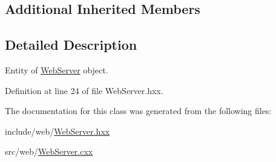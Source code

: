 \subsection*{Additional Inherited Members}


\subsection{Detailed Description}
Entity of \mbox{\hyperlink{classeven_1_1_web_server}{Web\+Server}} object. 

Definition at line 24 of file Web\+Server.\+hxx.



The documentation for this class was generated from the following files\+:\begin{DoxyCompactItemize}
\item 
include/web/\mbox{\hyperlink{_web_server_8hxx}{Web\+Server.\+hxx}}\item 
src/web/\mbox{\hyperlink{_web_server_8cxx}{Web\+Server.\+cxx}}\end{DoxyCompactItemize}
